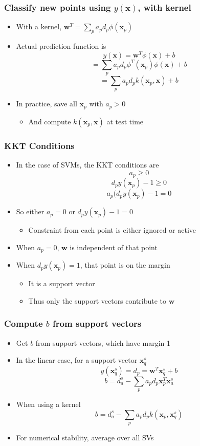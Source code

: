 \documentclass[12pt,notes,mathserif]{beamer}
\begin{document}
\begin{frame}[c]
\frametitle{Classify new points using $y(\bm{x})$, with kernel}
\begin{itemize}
\item With a kernel, $\bm{w}^T=\sum_pa_pd_p\phi(\bm{x}_p)$
\item Actual prediction function is
\[
y(\bm{x})=\bm{w}^T\phi(\bm{x})+b
\]
\[
=\sum_pa_pd_p\phi^T(\bm{x}_p)\phi(\bm{x})+b
\]
\[
=\sum_pa_pd_pk(\bm{x}_p,\bm{x})+b
\]
\item In practice, save all $\bm{x}_p$ with $a_p> 0$
\begin{itemize}
\item And compute $k(\bm{x}_p,\bm{x})$ at test time
\end{itemize}
\end{itemize}
\end{frame}



\begin{frame}[c]
\frametitle{KKT Conditions}
\begin{itemize}
\item In the case of SVMs, the KKT conditions are
\[
a_p\geqslant{}0
\]
\[
d_py(\bm{x}_p)-1\geqslant{}0
\]
\[
a_p(d_py(\bm{x}_p)-1=0
\]
\item So either $a_p=0$ or $d_py(\bm{x}_p)-1=0$
\begin{itemize}
\item Constraint from each point is either ignored or active
\end{itemize}
\item When $a_p=0$, $\bm{w}$ is independent of that point
\item When $d_py(\bm{x}_p)=1$, that point is on the margin
\begin{itemize}
\item It is a support vector
\item Thus only the support vectors contribute to $\bm{w}$
\end{itemize}
\end{itemize}
\end{frame}


\begin{frame}[c]
\frametitle{Compute $b$ from support vectors}
\begin{itemize}
\item Get $b$ from support vectors, which have margin 1
\item In the linear case, for a support vector $\bm{x}_q^s$
\[
y(\bm{x}_q^s)=d_p=\bm{w}^T\bm{x}_q^s+b
\]
\[
b=d_a^s -\sum_pa_pd_p\bm{x}_p^T\bm{x}_a^s
\]
\item When using a kernel
\[
b=d_a^s-\sum_pa_pd_pk(\bm{x}_p,\bm{x}_q^s)
\]
\item For numerical stability, average over all SVs
\end{itemize}
\end{frame}
\end{document}
